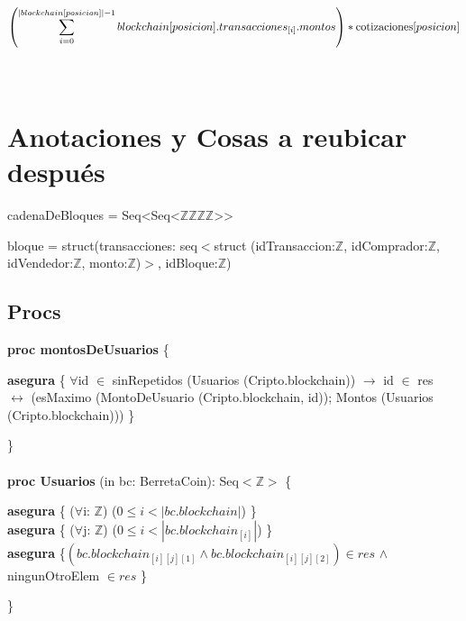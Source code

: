 \documentclass{article}
\newcommand{\Entero}{$\mathds{Z}$}
\newcommand{\tuplaDeTuplaDeCuatroEnteros}{{Seq\textless Seq\textless\Entero\texttimes\Entero\texttimes\Entero\texttimes\Entero\textgreater\textgreater}}
\begin{document}
        \indent\indent $\left( \mathlarger{\sum\limits_{i=0}^{|blockchain[posicion]|-1} blockchain[posicion].transacciones_{[i]}.montos} \right) * \text{cotizaciones}[posicion]$\\\\\\





\newpage
\section*{Anotaciones y Cosas a reubicar después}
cadenaDeBloques = \tuplaDeTuplaDeCuatroEnteros

bloque = struct(transacciones: seq$<$struct (idTransaccion:\Entero, idComprador:\Entero,
                                            idVendedor:\Entero, monto:\Entero)$>$, idBloque:\Entero)

\subsection*{Procs}
\textbf{proc montosDeUsuarios} \{

        \indent\indent \textbf{asegura} \{ $\forall$id $\in$ sinRepetidos (Usuarios (Cripto.blockchain)) $\rightarrow$ id $\in$ res\\
        \indent\indent\indent\indent\indent $\longleftrightarrow$ (esMaximo (MontoDeUsuario (Cripto.blockchain, id));
                                            Montos (Usuarios (Cripto.blockchain))) \}

    \}\\\\

\textbf{proc Usuarios} (in bc: BerretaCoin): Seq$<$\Entero$>$ \{

    \indent\indent \textbf{asegura} \{ ($\forall$i: \Entero) ($0 \le i < |bc.blockchain|$) \}\\

    \indent\indent \textbf{asegura} \{ ($\forall$j: \Entero) ($0 \le i < |bc.blockchain_{[i]}|$) \}\\

    \indent\indent \textbf{asegura} \{$ (bc.blockchain_{[i][j][1]} \land bc.blockchain_{[i][j][2]}) \in res$
                                            $\land$ ningunOtroElem $\in res$ \}
    
    \}\\\\
\end{document}
